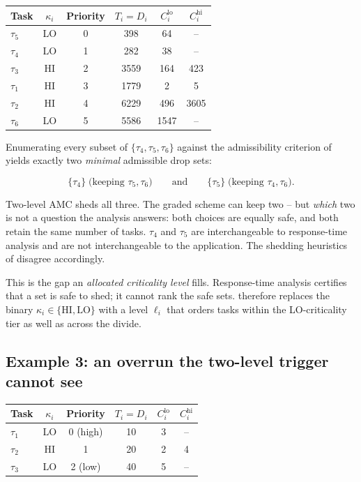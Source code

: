 \documentclass{article}
\begin{document}
\begin{center}
\begin{tabular}{lccccc}
\toprule
Task & $\kappa_i$ & Priority & $T_i = D_i$ & $C_i^{\mathrm{lo}}$ & $C_i^{\mathrm{hi}}$ \\
\midrule
$\tau_5$ & LO & 0 & 398  & 64   & --   \\
$\tau_4$ & LO & 1 & 282  & 38   & --   \\
$\tau_3$ & HI & 2 & 3559 & 164  & 423  \\
$\tau_1$ & HI & 3 & 1779 & 2    & 5    \\
$\tau_2$ & HI & 4 & 6229 & 496  & 3605 \\
$\tau_6$ & LO & 5 & 5586 & 1547 & --   \\
\bottomrule
\end{tabular}
\end{center}

\noindent Enumerating every subset of $\{\tau_4, \tau_5, \tau_6\}$ against the
admissibility criterion of  yields exactly two
\emph{minimal} admissible drop sets:

\[
\{\tau_4\} \;\text{(keeping } \tau_5, \tau_6\text{)}
\qquad\text{and}\qquad
\{\tau_5\} \;\text{(keeping } \tau_4, \tau_6\text{)} .
\]

Two-level AMC sheds all three. The graded scheme can keep two -- but
\emph{which} two is not a question the analysis answers: both choices are
equally safe, and both retain the same number of tasks. $\tau_4$ and $\tau_5$
are interchangeable to response-time analysis and are not interchangeable to
the application. The shedding heuristics of  disagree
accordingly.

This is the gap an \emph{allocated criticality level} fills. Response-time
analysis certifies that a set is safe to shed; it cannot rank the safe sets.
 therefore replaces the binary
$\kappa_i \in \{\mathrm{HI}, \mathrm{LO}\}$ with a level $\ell_i$ that orders
tasks within the LO-criticality tier as well as across the divide.

\subsection{Example 3: an overrun the two-level trigger cannot see}
\label{sec:ex-blindspot}

\begin{center}
\begin{tabular}{lccccc}
\toprule
Task & $\kappa_i$ & Priority & $T_i = D_i$ & $C_i^{\mathrm{lo}}$ & $C_i^{\mathrm{hi}}$ \\
\midrule
$\tau_1$ & LO & 0 (high) & 10 & 3 & -- \\
$\tau_2$ & HI & 1        & 20 & 2 & 4  \\
$\tau_3$ & LO & 2 (low)  & 40 & 5 & -- \\
\bottomrule
\end{tabular}
\end{center}
\end{document}
